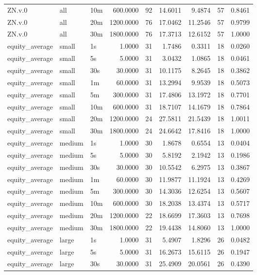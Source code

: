 \begin{tabular}{lllrrrrrr}
ZN.v.0 & all & 10m & 600.0000 & 92 & 14.6011 & 9.4874 & 57 & 0.8461 \\
ZN.v.0 & all & 20m & 1200.0000 & 76 & 17.0462 & 11.2546 & 57 & 0.9799 \\
ZN.v.0 & all & 30m & 1800.0000 & 76 & 17.3713 & 12.6152 & 57 & 1.0000 \\
equity_average & small & 1s & 1.0000 & 31 & 1.7486 & 0.3311 & 18 & 0.0260 \\
equity_average & small & 5s & 5.0000 & 31 & 3.0432 & 1.0865 & 18 & 0.0461 \\
equity_average & small & 30s & 30.0000 & 31 & 10.1175 & 8.2645 & 18 & 0.3862 \\
equity_average & small & 1m & 60.0000 & 31 & 13.2994 & 9.9539 & 18 & 0.5073 \\
equity_average & small & 5m & 300.0000 & 31 & 17.4806 & 13.1972 & 18 & 0.7701 \\
equity_average & small & 10m & 600.0000 & 31 & 18.7107 & 14.1679 & 18 & 0.7864 \\
equity_average & small & 20m & 1200.0000 & 24 & 27.5811 & 21.5439 & 18 & 1.0011 \\
equity_average & small & 30m & 1800.0000 & 24 & 24.6642 & 17.8416 & 18 & 1.0000 \\
equity_average & medium & 1s & 1.0000 & 30 & 1.8678 & 0.6554 & 13 & 0.0404 \\
equity_average & medium & 5s & 5.0000 & 30 & 5.8192 & 2.1942 & 13 & 0.1986 \\
equity_average & medium & 30s & 30.0000 & 30 & 10.5542 & 6.2975 & 13 & 0.3867 \\
equity_average & medium & 1m & 60.0000 & 30 & 11.9877 & 11.1924 & 13 & 0.4269 \\
equity_average & medium & 5m & 300.0000 & 30 & 14.3036 & 12.6254 & 13 & 0.5607 \\
equity_average & medium & 10m & 600.0000 & 30 & 18.2038 & 13.4374 & 13 & 0.5717 \\
equity_average & medium & 20m & 1200.0000 & 22 & 18.6699 & 17.3603 & 13 & 0.7698 \\
equity_average & medium & 30m & 1800.0000 & 22 & 19.4438 & 14.8060 & 13 & 1.0000 \\
equity_average & large & 1s & 1.0000 & 31 & 5.4907 & 1.8296 & 26 & 0.0482 \\
equity_average & large & 5s & 5.0000 & 31 & 16.2673 & 15.6115 & 26 & 0.1947 \\
equity_average & large & 30s & 30.0000 & 31 & 25.4909 & 20.0561 & 26 & 0.4390 \\

\end{tabular}
